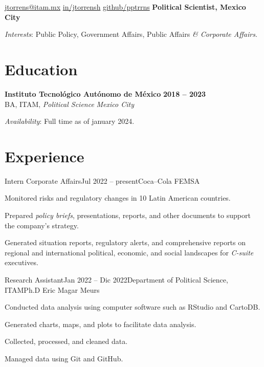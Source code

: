 \documentclass[letter]{resume}
\begin{document}
\begin{center}
{\href{mailto://jtorrens@itam.mx}{jtorrens@itam.mx}}
{\href{https://www.linkedin.com/in/jtorrensh/}{in/jtorrensh}}
{\href{https://github.com/pptrrns}{github/pptrrns}}
{\bf Political Scientist, Mexico City}

\emph{Interests}: {Public Policy, Government Affairs, Public Affairs \em\& Corporate Affairs.}
\end{center}

\section{Education} 
\begin{content}
{\bf Instituto Tecnológico Autónomo de México} \emph {} \hfill {\bf 2018 -- 2023} \\ 
{BA, ITAM, \emph{Political Science}} \hfill \emph {Mexico City}

\emph{Availability}: {Full time as of january 2024.}

\sectionlineskip
\end{content}

\section{Experience}
\begin{content}

\begin{position}{Intern Corporate Affairs}{Jul 2022 -- present}{Coca–Cola FEMSA}{}{}
  \item Monitored risks and regulatory changes in 10 Latin American countries.
  \item Prepared \emph{policy briefs}, presentations, reports, and other documents to support the company's strategy.
  \item Generated situation reports, regulatory alerts, and comprehensive reports on regional and international political, economic, and social landscapes for \emph{C-suite} executives.
\end{position}
\vspace{-.0001 \baselineskip}

\begin{position}{Research Assistant}{Jan 2022 -- Dic 2022}{Department of Political Science, ITAM}{Ph.D Eric Magar Meurs}{}
  \item Conducted data analysis using computer software such as RStudio and CartoDB.
  \item Generated charts, maps, and plots to facilitate data analysis.
  \item Collected, processed, and cleaned data.
  \item Managed data using Git and GitHub.
\end{position}
\vspace{-.0001 \baselineskip}

\sectionlineskip
\end{content}
\end{document}

